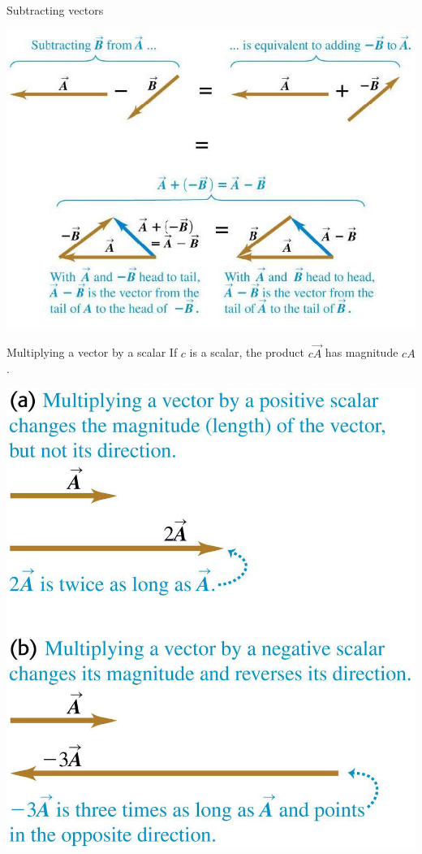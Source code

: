 \documentclass[18pt]{LectMechanics}
\begin{document}
\begin{frame}{Subtracting vectors}{}
	\begin{center}
		\includegraphics[width=0.8\linewidth]{Substracting_vectors}
	\end{center}
\end{frame}


\begin{frame}{Multiplying a vector by a scalar}{}
	If $c$ is a scalar, the product $c\vec A$ has magnitude $cA$.


	\begin{center}
		\includegraphics[width=0.4\linewidth]{Multiplying_by_scalar}
	\end{center}
\end{frame}
\end{document}
